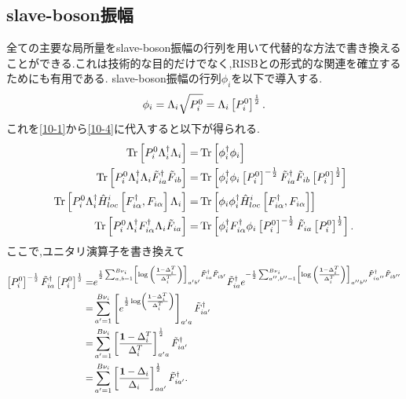 \subsection{slave-boson振幅}
全ての主要な局所量をslave-boson振幅の行列を用いて代替的な方法で書き換えることができる.これは技術的な目的だけでなく,RISBとの形式的な関連を確立するためにも有用である.
slave-boson振幅の行列$\phi_{i}$を以下で導入する.
\begin{equation}
  \phi_{i}=\Lambda_{i}\sqrt{P^{0}_{i}}=\Lambda_{i}\left[ P^{0}_{i} \right]^{\frac{1}{2}}.
\end{equation}
これを\eqref{10-1}から\eqref{10-4}に代入すると以下が得られる.
\begin{align}
    \Tr \left[ P^{0}_{i}\Lambda^\dagger_{i}\Lambda_{i} \right]=&\Tr \left[ \phi^\dagger_{i}\phi_{i} \right]  \label{11-1}\\
    \Tr \left[ P^{0}_{i}\Lambda^\dagger_{i}\Lambda_{i}\tilde{F}^\dagger_{ia}\tilde{F}_{ib} \right]=&\Tr \left[ \phi^\dagger_{i}\phi_{i}\left[ P^{0}_{i} \right]^{-\frac{1}{2}}\tilde{F}^\dagger_{ia}\tilde{F}_{ib}\left[ P^{0}_{i} \right]^{\frac{1}{2}} \right] \label{11-2} \\
    \Tr \left[ P^{0}_{i}\Lambda^\dagger_{i}\hat{H}^{i}_{loc}\left[ F^\dagger_{i\alpha}, F_{i\alpha} \right]\Lambda_{i} \right]=&\Tr \left[ \phi_{i}\phi^\dagger_{i}\hat{H}^{i}_{loc}\left[ F^\dagger_{i\alpha},F_{i\alpha} \right] \right] \label{11-3} \\
    \Tr \left[ P^{0}_{i}\Lambda^\dagger_{i}F^\dagger_{i\alpha}\Lambda_{i}\tilde{F}_{ia} \right]=&\Tr \left[ \phi^\dagger_{i}F^\dagger_{i\alpha}\phi_{i}\left[ P^{0}_{i} \right]^{-\frac{1}{2}}\tilde{F}_{ia}\left[ P^{0}_{i} \right]^{\frac{1}{2}} \right]. \label{11-4}
\end{align}
ここで,ユニタリ演算子を書き換えて
\begin{equation}
\begin{split}
    \left[ P^{0}_{i} \right]^{-\frac{1}{2}}\tilde{F}^\dagger_{ia}\left[ P^{0}_{i} \right]^{\frac{1}{2}}
    =&e^{\frac{1}{2}\sum_{a,b=1}^{B\nu_{i}}\left[ \log{ \left( \frac{\bm{1}-\Delta^{T}_{i}}{\Delta^{T}_{i}} \right)} \right]_{a'b'}\tilde{F}^\dagger_{ia}\tilde{F}_{ib'}}\tilde{F}^\dagger_{ia}e^{-\frac{1}{2}\sum_{a'',b''=1}^{B\nu_{i}}\left[ \log{ \left( \frac{\bm{1}-\Delta^{T}_{i}}{\Delta^{T}_{i}} \right)} \right]_{a''b''}\tilde{F}^\dagger_{ia''}\tilde{F}_{ib''}}\\
    =&\sum_{a'=1}^{B\nu_{i}}\left[ e^{\frac{1}{2}\log \left( \frac{\bm{1}-\Delta^{T}_{i}}{\Delta^{T}_{i}} \right)} \right]_{a'a}\tilde{F}^\dagger_{ia'}\\
    =&\sum_{a'=1}^{B\nu_{i}}\left[ \frac{\bm{1}-\Delta^{T}_{i}}{\Delta^{T}_{i}} \right]_{a'a}^{\frac{1}{2}}\tilde{F}^\dagger_{ia'}\\
    =&\sum_{a'=1}^{B\nu_{i}}\left[ \frac{\bm{1}-\Delta_{i}}{\Delta_{i}} \right]_{aa'}^{\frac{1}{2}}\tilde{F}^\dagger_{ia'}. \label{11-5} 
\end{split}
\end{equation}
